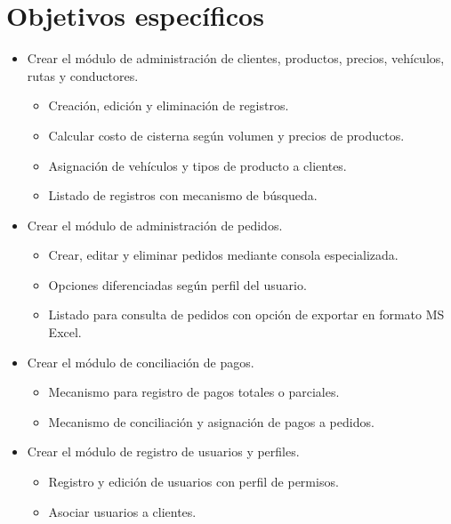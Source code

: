\section*{Objetivos específicos}
\begin{itemize}
    \item Crear el módulo de administración de clientes, productos, precios, vehículos, rutas y conductores.
    \begin{itemize}
        \item Creación, edición y eliminación de registros.
        \item Calcular costo de cisterna según volumen y precios de productos.
        \item Asignación de vehículos y tipos de producto a clientes.
        \item Listado de registros con mecanismo de búsqueda.
    \end{itemize}

    \item Crear el módulo de administración de pedidos.
    \begin{itemize}
        \item Crear, editar y eliminar pedidos mediante consola especializada.
        \item Opciones diferenciadas según perfil del usuario.
        \item Listado para consulta de pedidos con opción de exportar en formato MS Excel.
    \end{itemize}

    \item Crear el módulo de conciliación de pagos.
    \begin{itemize}
        \item Mecanismo para registro de pagos totales o parciales.
        \item Mecanismo de conciliación y asignación de pagos a pedidos.
    \end{itemize}

    \item Crear el módulo de registro de usuarios y perfiles.
    \begin{itemize}
        \item Registro y edición de usuarios con perfil de permisos.
        \item Asociar usuarios a clientes.
    \end{itemize}
\end{itemize}